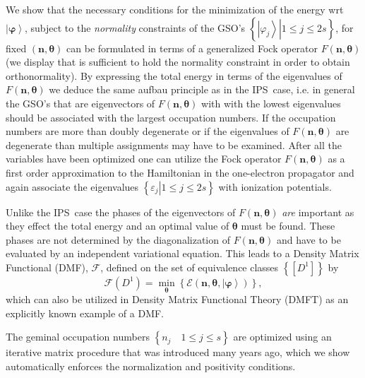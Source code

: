 \documentclass[aps,preprint]{revtex4}%
\begin{document}
We show that the necessary conditions for the minimization of the energy wrt
$\left\vert \mathbf{\varphi}\right\rangle $, subject to the \emph{normality}
constraints of the GSO's $\left\{  \left.  \left\vert \varphi_{j}\right\rangle
\right\vert 1\leq j\leq2s\right\}  $, for fixed $\left(  \mathbf{n}%
,\mathbf{\theta}\right)  $ can be formulated in terms of a generalized Fock
operator $F\left(  \mathbf{n},\mathbf{\theta}\right)  $ (we display that is
sufficient to hold the normality constraint in order to obtain
orthonormality). By expressing the total energy in terms of the eigenvalues of
$F\left(  \mathbf{n},\mathbf{\theta}\right)  $ we deduce the same aufbau
principle as in the IPS\ case, i.e. in general the GSO's that are eigenvectors
of $F\left(  \mathbf{n},\mathbf{\theta}\right)  $ with with the lowest
eigenvalues should be associated with the largest occupation numbers. If the
occupation numbers are more than doubly degenerate or if the eigenvalues of
$F\left(  \mathbf{n},\mathbf{\theta}\right)  $ are degenerate than multiple
assignments may have to be examined. After all the variables have been
optimized one can utilize the Fock operator $F\left(  \mathbf{n}%
,\mathbf{\theta}\right)  $ as a first order approximation to the Hamiltonian
in the one-electron propagator and again associate the eigenvalues $\left\{
\left.  \varepsilon_{j}\right\vert 1\leq j\leq2s\right\}  $ with ionization potentials.

Unlike the IPS\ case the phases of the eigenvectors of $F\left(
\mathbf{n},\mathbf{\theta}\right)  $ \emph{are }important as they effect the
total energy and an optimal value of $\mathbf{\theta}$ must be found. These
phases are not determined by the diagonalization of $F\left(  \mathbf{n}%
,\mathbf{\theta}\right)  $ and have to be evaluated by an independent
variational equation. This leads to a Density Matrix Functional (DMF),
$\mathcal{F}$, defined on the set of equivalence classes $\left\{  \left[
D^{1}\right]  \right\}  $ by\
\begin{equation}
\mathcal{F}\left(  D^{1}\right)  =\min_{\mathbf{\theta}}\left\{
\mathcal{E}\left(  \mathbf{n},\mathbf{\theta,}\left\vert \mathbf{\varphi
}\right\rangle \right)  \right\}  ,
\end{equation}
which can also be utilized in Density Matrix Functional Theory (DMFT) as an
explicitly known example of a DMF.

The geminal occupation numbers $\left\{  n_{j}\quad1\leq j\leq s\right\}  $
are optimized using an iterative matrix procedure that was introduced
\cite{weiner,ortiz,ohrn,jensen} many years ago, which we show automatically
enforces the normalization and positivity conditions.
\end{document}
